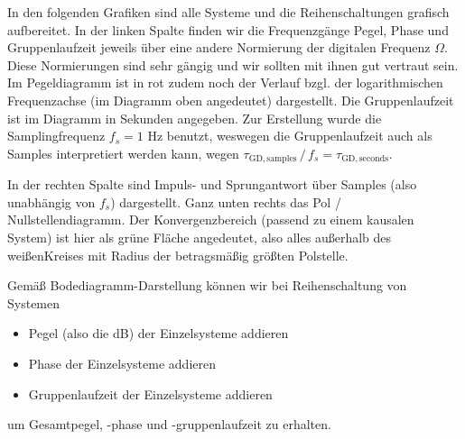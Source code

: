 \begin{Loesung}
\begin{center}
\end{center}

In den folgenden Grafiken sind alle Systeme und die Reihenschaltungen
grafisch aufbereitet.
In der linken Spalte finden wir die Frequenzgänge Pegel, Phase und Gruppenlaufzeit
jeweils über eine andere Normierung der digitalen Frequenz $\Omega$.
Diese Normierungen sind sehr gängig und wir sollten mit ihnen gut vertraut sein.
Im Pegeldiagramm ist in rot zudem noch der Verlauf bzgl. der logarithmischen
Frequenzachse (im Diagramm oben angedeutet) dargestellt.
Die Gruppenlaufzeit ist im Diagramm in Sekunden angegeben. Zur Erstellung
wurde die Samplingfrequenz $f_s=1$ Hz benutzt, weswegen
die Gruppenlaufzeit auch als Samples interpretiert werden kann, wegen
$\tau_\mathrm{GD,samples} \,/\, f_s = \tau_\mathrm{GD,seconds}$.

In der rechten Spalte sind Impuls- und Sprungantwort über Samples (also unabhängig
von $f_s$) dargestellt. Ganz unten rechts das Pol / Nullstellendiagramm.
Der Konvergenzbereich (passend zu einem kausalen System)
ist hier als grüne Fläche angedeutet, also alles außerhalb
des weißenKreises mit Radius der betragsmäßig größten Polstelle.

Gemäß Bodediagramm-Darstellung können wir bei Reihenschaltung von Systemen
\begin{itemize}
  \item Pegel (also die dB) der Einzelsysteme addieren
  \item Phase der Einzelsysteme addieren
  \item Gruppenlaufzeit der Einzelsysteme addieren
\end{itemize}
um Gesamtpegel, -phase und -gruppenlaufzeit zu erhalten.


\end{Loesung}
